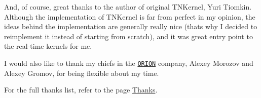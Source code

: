 And, of course, great thanks to the author of original T\+N\+Kernel, Yuri Tiomkin. Although the implementation of T\+N\+Kernel is far from perfect in my opinion, the ideas behind the implementation are generally really nice (that\textquotesingle{}s why I decided to reimplement it instead of starting from scratch), and it was great entry point to the real-\/time kernels for me.

I would also like to thank my chiefs in the \href{http://orionspb.ru/}{\tt O\+R\+I\+ON} company, Alexey Morozov and Alexey Gromov, for being flexible about my time.

For the full thanks list, refer to the page \hyperlink{thanks}{Thanks}. 